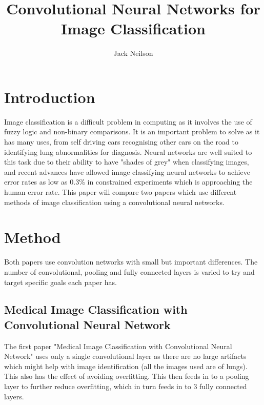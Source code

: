 \documentclass{article}
\begin{document}
\title{Convolutional Neural Networks for Image Classification}
\author{Jack Neilson}

\maketitle
\newpage
\section{Introduction}
Image classification is a difficult problem in computing as it involves the use of fuzzy logic and non-binary comparisons. It is an important problem to solve as it has many uses, from self driving cars recognising other cars on the road to identifying lung abnormalities for diagnosis\cite{medical}. Neural networks are well suited to this task due to their ability to have "shades of grey" when classifying images, and recent advances have allowed image classifying neural networks to achieve error rates as low as 0.3\% in constrained experiments which is approaching the human error rate\cite{imagenet}. This paper will compare two papers which use different methods of image classification using a convolutional neural networks. 

\section{Method}
Both papers use convolution networks with small but important differences. The number of convolutional, pooling and fully connected layers is varied to try and target specific goals each paper has.

\subsection{Medical Image Classification with Convolutional Neural Network}
The first paper "Medical Image Classification with Convolutional Neural Network" uses only a single convolutional layer as there are no large artifacts which might help with image identification (all the images used are of lungs)\cite{medical}. This also has the effect of avoiding overfitting\cite{medical}. This then feeds in to a pooling layer to further reduce overfitting, which in turn feeds in to 3 fully connected layers.


\end{document}
